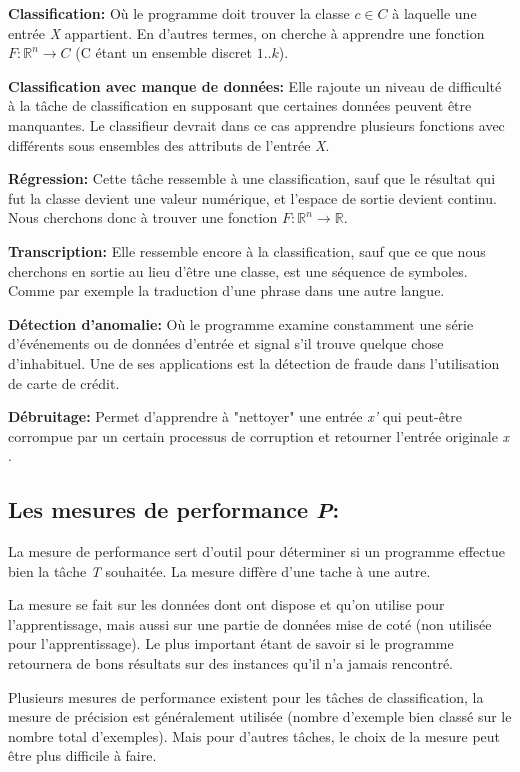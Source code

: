 \textbf{Classification:} Où le programme doit trouver la classe $c \in C$ à laquelle une entrée \textit{X} appartient. En d'autres termes, on cherche à apprendre une fonction $F : \mathbb{R}^{n} \rightarrow C$ (C étant un ensemble discret ${1..k}$).

\textbf{Classification avec manque de données:} Elle rajoute un niveau de difficulté à la tâche de classification en supposant que certaines données peuvent être manquantes. Le classifieur devrait dans ce cas apprendre plusieurs fonctions avec différents sous ensembles des attributs de l'entrée \textit{X}.

\textbf{Régression:} Cette tâche ressemble à une classification, sauf que le résultat qui fut la classe devient une valeur numérique, et l'espace de sortie devient continu. Nous cherchons donc à trouver une fonction $F : \mathbb{R}^{n} \rightarrow \mathbb{R}$.

\textbf{Transcription:} Elle ressemble encore à la classification, sauf que ce que nous cherchons en sortie au lieu d’être une classe, est une séquence de symboles. Comme par exemple la traduction d'une phrase dans une autre langue.

\textbf{Détection d'anomalie:} Où le programme examine constamment une série d’événements ou de données d'entrée et signal s'il trouve quelque chose d'inhabituel. Une de ses applications est la détection de fraude dans l'utilisation de carte de crédit.

\textbf{Débruitage:} Permet d'apprendre à "nettoyer" une entrée \textit{x'} qui peut-être corrompue par un certain processus de corruption et retourner l'entrée originale \textit{x} .


\subsection{Les mesures de performance \textit{P}:}
La mesure de performance sert d'outil pour déterminer si un programme effectue bien la tâche \textit{T} souhaitée. La mesure diffère d'une tache à une autre. 

La mesure se fait sur les données dont ont dispose et qu'on utilise pour l'apprentissage, mais aussi sur une partie de données mise de coté (non utilisée pour l'apprentissage). Le plus important étant de savoir si le programme retournera de bons résultats sur des instances qu'il n'a jamais rencontré.   

Plusieurs mesures de performance existent pour les tâches de classification, la mesure de précision est généralement utilisée (nombre d'exemple bien classé sur le nombre total d'exemples). Mais pour d'autres tâches, le choix de la mesure peut être plus difficile à faire.

